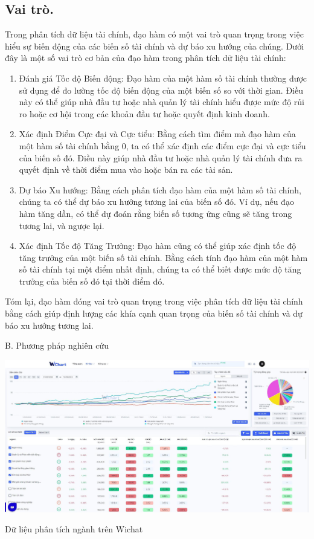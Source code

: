 \documentclass[12pt,a4paper]{report}
\begin{document}
\subsection{Vai trò.}
Trong phân tích dữ liệu tài chính, đạo hàm có một vai trò quan trọng trong việc hiểu sự
biến động của các biến số tài chính và dự báo xu hướng của chúng. Dưới đây là một số
vai trò cơ bản của đạo hàm trong phân tích dữ liệu tài chính:
\begin{enumerate}
    \item Đánh giá Tốc độ Biến động: Đạo hàm của một hàm số tài chính thường được sử dụng để đo lường tốc độ biến động của một biến số so với thời gian. Điều này có thể giúp nhà đầu tư hoặc nhà quản lý tài chính hiểu được mức độ rủi ro hoặc cơ hội trong các khoản đầu tư hoặc quyết định kinh doanh.
    \item Xác định Điểm Cực đại và Cực tiểu: Bằng cách tìm điểm mà đạo hàm của một hàm số tài chính bằng $0$, ta có thể xác định các điểm cực đại và cực tiểu của biến số đó. Điều này giúp nhà đầu tư hoặc nhà quản lý tài chính đưa ra quyết định về thời điểm mua vào hoặc bán ra các tài sản.
    \item Dự báo Xu hướng: Bằng cách phân tích đạo hàm của một hàm số tài chính, chúng ta có thể dự báo xu hướng tương lai của biến số đó. Ví dụ, nếu đạo hàm tăng dần, có thể dự đoán rằng biến số tương ứng cũng sẽ tăng trong tương lai, và ngược lại.
    \item Xác định Tốc độ Tăng Trưởng: Đạo hàm cũng có thể giúp xác định tốc độ tăng trưởng của một biến số tài chính. Bằng cách tính đạo hàm của một hàm số tài chính tại một điểm nhất định, chúng ta có thể biết được mức độ tăng trưởng của biến số đó tại thời điểm đó.
\end{enumerate}
Tóm lại, đạo hàm đóng vai trò quan trọng trong việc phân tích dữ liệu tài chính bằng cách giúp định lượng các khía cạnh quan trọng của biến số tài chính và dự báo xu hướng tương lai.
\newpage
\begin{center}
    \LARGE B. Phương pháp nghiên cứu
\end{center}
\begin{center}
    \includegraphics*[scale = 0.2]{1.png}
\end{center}
\begin{center}
    Dữ liệu phân tích ngành trên Wichat
\end{center}
\end{document}
